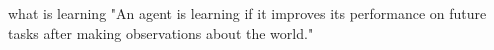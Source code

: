 what is learning
"An agent is learning if it improves its performance on future tasks after making observations about the world." \cite{russell2016artificial}






